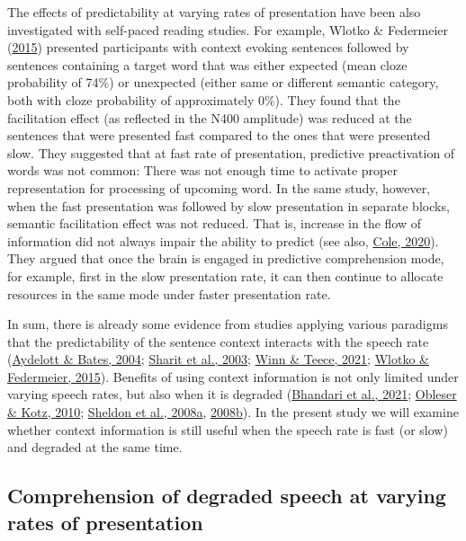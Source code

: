 \documentclass[a4paper, nobind]{templates/ociamthesis}
\begin{document}
The effects of predictability at varying rates of presentation have been also investigated with self-paced reading studies.
For example, Wlotko \& Federmeier (\protect\hyperlink{ref-Wlotko2015}{2015}) presented participants with context evoking sentences followed by sentences containing a target word that was either expected (mean cloze probability of 74\%) or unexpected (either same or different semantic category, both with cloze probability of approximately 0\%).
They found that the facilitation effect (as reflected in the N400 amplitude) was reduced at the sentences that were presented fast compared to the ones that were presented slow.
They suggested that at fast rate of presentation, predictive preactivation of words was not common: There was not enough time to activate proper representation for processing of upcoming word.
In the same study, however, when the fast presentation was followed by slow presentation in separate blocks, semantic facilitation effect was not reduced.
That is, increase in the flow of information did not always impair the ability to predict (see also, \protect\hyperlink{ref-Cole2020}{Cole, 2020}).
They argued that once the brain is engaged in predictive comprehension mode, for example, first in the slow presentation rate, it can then continue to allocate resources in the same mode under faster presentation rate.

In sum, there is already some evidence from studies applying various paradigms that the predictability of the sentence context interacts with the speech rate (\protect\hyperlink{ref-Aydelott2004}{Aydelott \& Bates, 2004}; \protect\hyperlink{ref-Sharit2003}{Sharit et al., 2003}; \protect\hyperlink{ref-Winn2021b}{Winn \& Teece, 2021}; \protect\hyperlink{ref-Wlotko2015}{Wlotko \& Federmeier, 2015}).
Benefits of using context information is not only limited under varying speech rates, but also when it is degraded (\protect\hyperlink{ref-Bhandari2021}{Bhandari et al., 2021}; \protect\hyperlink{ref-Obleser2010}{Obleser \& Kotz, 2010}; \protect\hyperlink{ref-Sheldon2008a}{Sheldon et al., 2008a}, \protect\hyperlink{ref-Sheldon2008b}{2008b}).
In the present study we will examine whether context information is still useful when the speech rate is fast (or slow) and degraded at the same time.

\hypertarget{comprehension-of-degraded-speech-at-varying-rates-of-presentation}{%
\subsection{Comprehension of degraded speech at varying rates of presentation}\label{comprehension-of-degraded-speech-at-varying-rates-of-presentation}}
\end{document}
